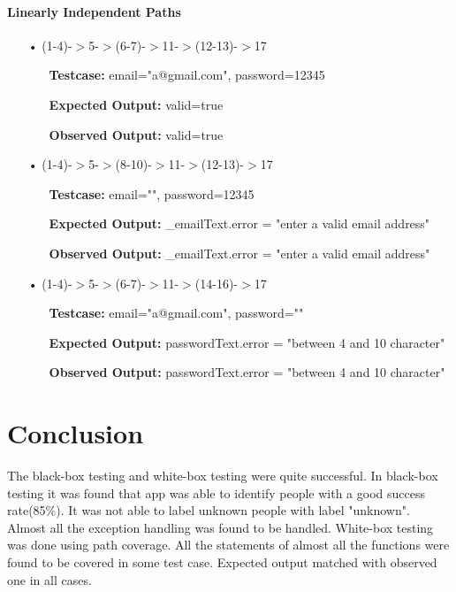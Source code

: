 \documentclass{scrreprt}
\begin{document}
\subsubsection{Linearly Independent Paths}
\begin{enumerate}
\item[•](1-4)-$>$5-$>$(6-7)-$>$11-$>$(12-13)-$>$17
\begin{itemize}
\item[]\textbf{Testcase: }email="a@gmail.com", password=12345
\item[]\textbf{Expected Output: }valid=true
\item[]\textbf{Observed Output: }valid=true
\end{itemize}


\item[•](1-4)-$>$5-$>$(8-10)-$>$11-$>$(12-13)-$>$17
\begin{itemize}
\item[]\textbf{Testcase: }email="", password=12345
\item[]\textbf{Expected Output: }_emailText.error = "enter a valid email address"
\item[]\textbf{Observed Output: }_emailText.error = "enter a valid email address"
\end{itemize}

\item[•](1-4)-$>$5-$>$(6-7)-$>$11-$>$(14-16)-$>$17
\begin{itemize}
\item[]\textbf{Testcase: }email="a@gmail.com", password=""
\item[]\textbf{Expected Output: }passwordText.error = "between 4 and 10 character"
\item[]\textbf{Observed Output: }passwordText.error = "between 4 and 10 character"
\end{itemize}

\end{enumerate}	


\chapter{Conclusion}
The black-box testing and white-box testing were quite successful. 
In black-box testing it was found that app was able to identify people with a good success rate(85\%). It was not able to label unknown people with label "unknown". Almost all the exception handling was found to be handled.
White-box testing was done using path coverage. All the statements of almost all the functions were found to be covered in some test case. Expected output matched with observed one in all cases.
\end{document}
